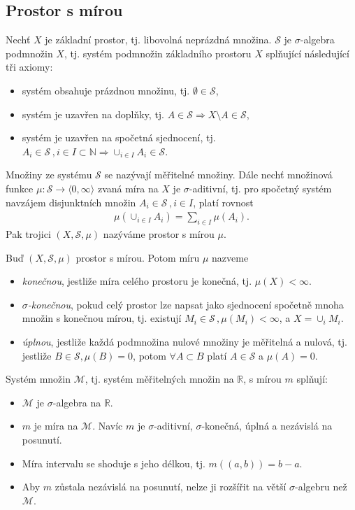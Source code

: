 \subsection{Prostor s mírou} 
\begin{definition}
Nechť $X$ je základní prostor, tj. libovolná neprázdná množina. $\mathscr{S}$ je $\sigma$-algebra podmnožin $X$, tj. systém podmnožin základního prostoru $X$
splňující následující tři axiomy:
\begin{itemize}
\item systém obsahuje prázdnou množinu, tj. $\emptyset\in\mathscr{S}$,
\item systém je uzavřen na doplňky, tj. $A \in\mathscr{S}\Rightarrow X\setminus A\in\mathscr{S}$,
\item systém je uzavřen na spočetná sjednocení, tj. $A_i\in \mathscr{S}\,,i\in I\subset\mathbb{N}\Rightarrow \cup_{i\in I} A_i \in \mathscr{S}$.
\end{itemize}
Množiny ze systému $\mathscr{S}$ se nazývají měřitelné množiny. Dále nechť množinová funkce $\mu:\mathscr{S}\rightarrow \langle 0,\infty\rangle$ zvaná míra na $X$ je $\sigma$-aditivní, tj. pro spočetný
systém navzájem disjunktních množin $A_i \in \mathscr{S}\,,i\in I$, platí rovnost 
\begin{align*}
\mu(\cup_{i\in I} A_i)=\sum_{i\in I} \mu(A_i).
\end{align*}
Pak trojici $(X, \mathscr{S}, \mu)$ nazýváme prostor s mírou $\mu$.
\end{definition}

\begin{definition}
Buď $(X, \mathscr{S}, \mu)$ prostor s mírou. Potom míru $\mu$ nazveme
\begin{itemize}
\item \textit{konečnou}, jestliže míra celého prostoru je  konečná, tj. $\mu(X)<\infty$.
\item $\sigma$\textit{-konečnou}, pokud celý prostor lze napsat jako sjednocení spočetně mnoha množin s konečnou mírou, tj. existují $M_i\in \mathscr{S}\,,\mu(M_i)<\infty$, a $X=\cup_i M_i.$
\item \textit{úplnou}, jestliže každá podmnožina nulové množiny je měřitelná a nulová, tj. jestliže $B\in\mathscr{S}, \mu(B)=0$, potom $\forall A\subset B$ platí $A\in \mathscr{S}$ a $\mu(A)=0.$
\end{itemize}
\end{definition}
\begin{theorem}
Systém množin $\mathscr{M}$, tj. systém měřitelných množin na $\mathbb{R}$, s mírou $m$ splňují: 
\begin{itemize}
\item $\mathscr{M}$  je $\sigma$-algebra na $\mathbb{R}$.
\item $m$ je míra na $\mathscr{M}$. Navíc $m$ je $\sigma$-aditivní, $\sigma$-konečná, úplná a nezávislá na posunutí. 
\item Míra intervalu se shoduje s jeho délkou, tj. $m((a,b))=b-a$.
\item Aby $m$ zůstala nezávislá na posunutí, nelze ji rozšířit na větší $\sigma$-algebru než $\mathscr{M}$.
\end{itemize} 
\end{theorem}
